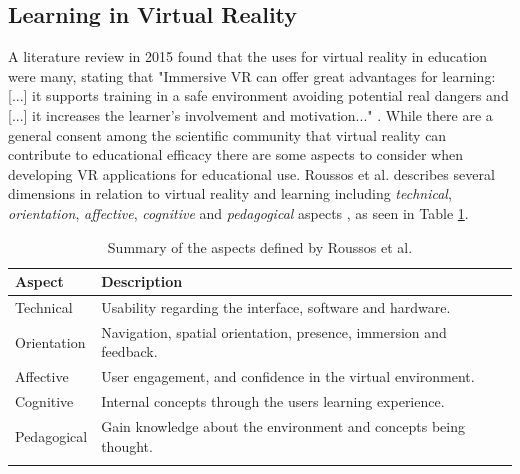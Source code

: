 
\subsection{Learning in Virtual Reality}

A literature review in 2015 found that the uses for virtual reality in education were many, stating that "Immersive VR can offer great advantages for learning:  [...] it supports training in a safe environment avoiding potential real dangers and [...] it increases the learner's involvement and motivation..." \cite{freina2015literature}. While there are a general consent among the scientific community that virtual reality can contribute to educational efficacy there are some aspects to consider when developing VR applications for educational use. Roussos et al. describes several dimensions in relation to virtual reality and learning including \textit{technical}, \textit{orientation}, \textit{affective}, \textit{cognitive} and \textit{pedagogical} aspects \cite{roussos1999learning}, as seen in Table \ref{table:awarenessAspects}.



\begin{table}[!ht]
      \centering
      \caption{Summary of the aspects defined by Roussos et al. \cite{roussos1999learning} }
        \begin{tabularx}{\textwidth}{l X}
        \toprule
        Aspect \hspace{1.5cm} & Description \\
        \midrule
        Technical & Usability regarding the interface, software and hardware.
        \vspace{0.2cm}
        \\
        Orientation & Navigation, spatial orientation, presence, immersion and feedback. 
        \vspace{0.2cm}
        \\
        Affective & User engagement, and confidence in the virtual environment.
        \vspace{0.2cm}
        \\
        Cognitive & Internal concepts through the users learning experience.
        \vspace{0.2cm}
        \\
        Pedagogical & Gain knowledge about the environment and concepts being thought.
        \vspace{0.2cm}
        \\
        \bottomrule
        \label{table:awarenessAspects}
        \end{tabularx}
\end{table}

